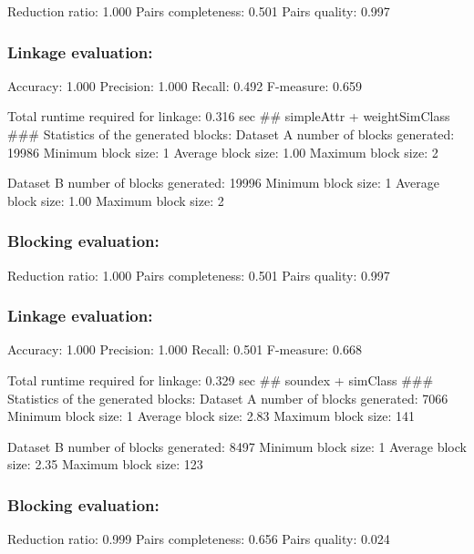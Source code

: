 \documentclass[
  letterpaper,
  DIV=11,
  numbers=noendperiod]{scrartcl}
\begin{document}
Reduction ratio: 1.000 Pairs completeness: 0.501 Pairs quality: 0.997

\hypertarget{linkage-evaluation-1}{%
\subsubsection{Linkage evaluation:}\label{linkage-evaluation-1}}

Accuracy: 1.000 Precision: 1.000 Recall: 0.492 F-measure: 0.659

Total runtime required for linkage: 0.316 sec \#\# simpleAttr +
weightSimClass \#\#\# Statistics of the generated blocks: Dataset A
number of blocks generated: 19986 Minimum block size: 1 Average block
size: 1.00 Maximum block size: 2

Dataset B number of blocks generated: 19996 Minimum block size: 1
Average block size: 1.00 Maximum block size: 2

\hypertarget{blocking-evaluation-2}{%
\subsubsection{Blocking evaluation:}\label{blocking-evaluation-2}}

Reduction ratio: 1.000 Pairs completeness: 0.501 Pairs quality: 0.997

\hypertarget{linkage-evaluation-2}{%
\subsubsection{Linkage evaluation:}\label{linkage-evaluation-2}}

Accuracy: 1.000 Precision: 1.000 Recall: 0.501 F-measure: 0.668

Total runtime required for linkage: 0.329 sec \#\# soundex + simClass
\#\#\# Statistics of the generated blocks: Dataset A number of blocks
generated: 7066 Minimum block size: 1 Average block size: 2.83 Maximum
block size: 141

Dataset B number of blocks generated: 8497 Minimum block size: 1 Average
block size: 2.35 Maximum block size: 123

\hypertarget{blocking-evaluation-3}{%
\subsubsection{Blocking evaluation:}\label{blocking-evaluation-3}}

Reduction ratio: 0.999 Pairs completeness: 0.656 Pairs quality: 0.024
\end{document}
